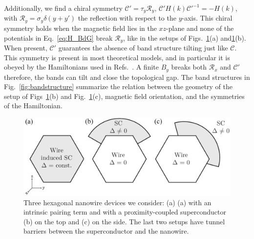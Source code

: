 
Additionally, we find a chiral symmetry $\mathcal{C}'=\tau_y\mathcal{R}_y$, $\mathcal{C}'H\left(k\right)\mathcal{C}'^{-1}=-H\left(k\right)$, with $\mathcal{R}_y = \sigma_y \delta(y + y')$ the reflection with respect to the $y$-axis.
This chiral symmetry holds when the magnetic field lies in the $xz$-plane and none of the potentials in Eq.~\eqref{eq:H_BdG} break $\mathcal{R}_y$, like in the setups of Figs.~\ref{fig:geometry}(a) and\ref{fig:geometry}(b).
When present, $\mathcal{C}'$ guarantees the absence of band structure tilting just like $\mathcal{C}$.
This symmetry is present in most theoretical models, and in particular it is obeyed by the Hamiltonians used in Refs.~\cite{Osca2015,Lim2013,Lim2012}.
A finite $B_y$ breaks both $\mathcal{R}_x$ and $\mathcal{C}'$ therefore, the bands can tilt and close the topological gap.
The band structures in Fig.~\ref{fig:bandstructure} summarize the relation between the geometry of the setup of Figs~\ref{fig:geometry}(b) and Fig.~\ref{fig:geometry}(c), magnetic field orientation, and the symmetries of the Hamiltonian.

\begin{figure}
\includegraphics[width=0.95\columnwidth]{chapter_orbitalfield/figures/geometry}
\caption{Three hexagonal nanowire devices we consider: (a) (a) with an intrinsic pairing term and with a proximity-coupled superconductor (b) on the top and (c) on the side.
The last two setups have tunnel barriers between the superconductor and the nanowire.
\label{fig:geometry}}
\end{figure}


